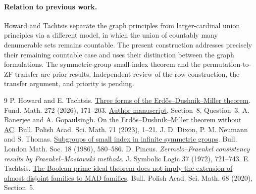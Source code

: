 \documentclass[11pt]{article}
\begin{document}
\paragraph{Relation to previous work.} Howard and Tachtsis \cite[Theorem~6.29 and Section~6.9]{ht} separate the graph principles from larger-cardinal union principles via a different model, in which the union of countably many denumerable sets remains countable. The present construction addresses precisely their remaining countable case and uses their distinction between the graph formulations. The symmetric-group small-index theorem and the permutation-to-ZF transfer are prior results. Independent review of the row construction, the transfer argument, and priority is pending.
\begin{thebibliography}{9}
 P. Howard and E. Tachtsis. \href{https://doi.org/10.4064/fm250514-20-7}{Three forms of the Erdős--Dushnik--Miller theorem}. Fund. Math. 272 (2026), 171--203. \href{https://arxiv.org/abs/2410.18229}{Author manuscript}, Section~8, Question~3.
 A. Banerjee and A. Gopaulsingh. \href{https://doi.org/10.4064/ba221221-6-6}{On the Erdős--Dushnik--Miller theorem without AC}. Bull. Polish Acad. Sci. Math. 71 (2023), 1--21.
 J. D. Dixon, P. M. Neumann and S. Thomas. \href{https://doi.org/10.1112/blms/18.6.580}{Subgroups of small index in infinite symmetric groups}. Bull. London Math. Soc. 18 (1986), 580--586.
 D. Pincus. \emph{Zermelo--Fraenkel consistency results by Fraenkel--Mostowski methods}. J. Symbolic Logic 37 (1972), 721--743.
 E. Tachtsis. \href{https://doi.org/10.4064/ba201014-22-1}{The Boolean prime ideal theorem does not imply the extension of almost disjoint families to MAD families}. Bull. Polish Acad. Sci. Math. 68 (2020), Section~5.
\end{thebibliography}
\end{document}
